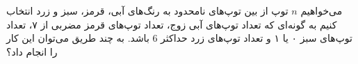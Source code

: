 \p
     می‌خواهیم 
	 $n$ 
	توپ از بین توپ‌های نامحدود به رنگ‌های آبی، قرمز، سبز و زرد انتخاب کنیم به گونه‌ای که تعداد توپ‌های آبی زوج،
	 تعداد توپ‌‌های قرمز مضربی از ۷، تعداد توپ‌های سبز ۰ یا ۱ و تعداد توپ‌های زرد حداکثر 6 باشد.
	  به چند طریق می‌توان این کار را انجام داد؟